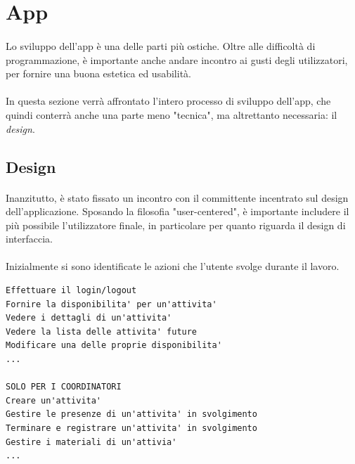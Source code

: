\documentclass[11pt,a4paper,english]{article}
\begin{document}
\section{App}

\paragraph{} Lo sviluppo dell'app è una delle parti più ostiche. Oltre alle difficoltà di programmazione, è importante anche andare incontro ai gusti degli utilizzatori, per fornire una buona estetica ed usabilità. 

\paragraph{} In questa sezione verrà affrontato l'intero processo di sviluppo dell'app, che quindi conterrà anche una parte meno "tecnica", ma altrettanto necessaria: il \emph{design}.

\subsection{Design} 

\paragraph{} Inanzitutto, è stato fissato un incontro con il committente incentrato sul design dell'applicazione. Sposando la filosofia "user-centered", è importante includere il più possibile l'utilizzatore finale, in particolare per quanto riguarda il design di interfaccia. 


\paragraph{} Inizialmente si sono identificate le azioni che l'utente svolge durante il lavoro. 

\begin{lstlisting}[title=Lista dei task]
Effettuare il login/logout
Fornire la disponibilita' per un'attivita'
Vedere i dettagli di un'attivita'
Vedere la lista delle attivita' future
Modificare una delle proprie disponibilita'
...

SOLO PER I COORDINATORI
Creare un'attivita'
Gestire le presenze di un'attivita' in svolgimento
Terminare e registrare un'attivita' in svolgimento
Gestire i materiali di un'attivia'
...
\end{lstlisting}
\end{document}
